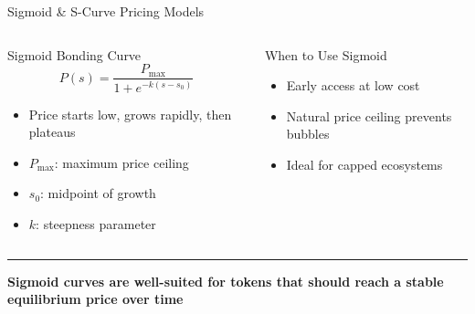 \documentclass[8pt,aspectratio=169]{beamer}
\newcommand{\bottomnote}[1]{\vfill\vspace{-2mm}\textcolor{mllavender2}{\rule{\textwidth}{0.4pt}}\vspace{1mm}\footnotesize\textbf{#1}}
\begin{document}
\begin{frame}{Sigmoid \& S-Curve Pricing Models}
\begin{columns}[T]
\begin{block}{Sigmoid Bonding Curve}
\footnotesize
\[
P(s) = \frac{P_{\max}}{1 + e^{-k(s - s_0)}}
\]
\begin{itemize}
  \item Price starts low, grows rapidly, then plateaus
  \item $P_{\max}$: maximum price ceiling
  \item $s_0$: midpoint of growth
  \item $k$: steepness parameter
\end{itemize}
\end{block}
\vspace{2mm}
\begin{exampleblock}{\footnotesize When to Use Sigmoid}
\footnotesize
\begin{itemize}
  \item Early access at low cost
  \item Natural price ceiling prevents bubbles
  \item Ideal for capped ecosystems
\end{itemize}
\end{exampleblock}

\end{columns}
\bottomnote{Sigmoid curves are well-suited for tokens that should reach a stable equilibrium price over time}
\end{frame}
\end{document}
